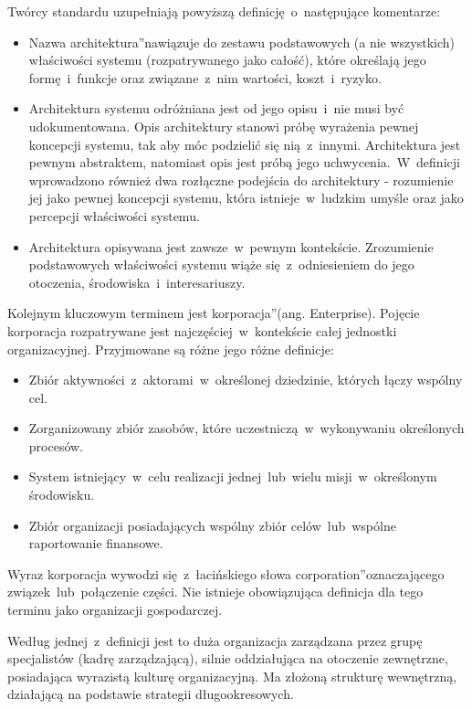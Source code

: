 Twórcy standardu uzupełniają powyższą definicję~o~następujące komentarze: 
\begin{itemize}
\item{Nazwa \quotedblbase architektura\textquotedblright nawiązuje do zestawu podstawowych (a nie wszystkich) właściwości systemu (rozpatrywanego jako całość), które określają jego formę~i~funkcje oraz związane~z~nim wartości, koszt~i~ryzyko.}
\item{Architektura systemu odróżniana jest od jego opisu~i~nie musi być udokumentowana. Opis architektury stanowi próbę wyrażenia pewnej koncepcji systemu, tak aby móc podzielić się nią~z~innymi. Architektura jest pewnym abstraktem, natomiast opis jest próbą jego uchwycenia.~W~definicji wprowadzono również dwa rozłączne podejścia do architektury - rozumienie jej jako pewnej koncepcji systemu, która istnieje~w~ludzkim umyśle oraz jako percepcji właściwości systemu.}
\item{Architektura opisywana jest zawsze~w~pewnym kontekście. Zrozumienie podstawowych właściwości systemu wiąże się~z~odniesieniem do jego otoczenia, środowiska~i~interesariuszy.}
\end{itemize}

Kolejnym kluczowym terminem jest \quotedblbase korporacja\textquotedblright (ang. Enterprise). Pojęcie korporacja rozpatrywane jest najczęściej~w~kontekście całej jednostki organizacyjnej. Przyjmowane są różne jego różne definicje:
\begin{itemize}
\item{Zbiór aktywności~z~aktorami~w~określonej dziedzinie, których łączy wspólny cel.}
\item{Zorganizowany zbiór zasobów, które uczestniczą~w~wykonywaniu określonych procesów.}
\item{System istniejący~w~celu realizacji jednej~lub~wielu misji~w~określonym środowisku.}
\item{Zbiór organizacji posiadających wspólny zbiór celów~lub~wspólne raportowanie finansowe.}
\end{itemize}

Wyraz korporacja wywodzi się~z~łacińskiego słowa \quotedblbase corporation\textquotedblright oznaczającego związek~lub~połączenie części. Nie istnieje obowiązująca definicja dla tego terminu jako organizacji gospodarczej. 

Według jednej~z~definicji jest to duża organizacja zarządzana przez grupę specjalistów (kadrę zarządzającą), silnie oddziałująca na otoczenie zewnętrzne, posiadająca wyrazistą kulturę organizacyjną. Ma złożoną strukturę wewnętrzną, działającą na podstawie strategii długookresowych.

